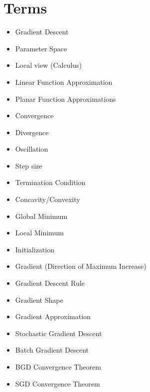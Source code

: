 \section{Terms}
    
    \begin{itemize}
        \item Gradient Descent
        \item Parameter Space
        \item Local view (Calculus)
        \item Linear Function Approximation
        \item Planar Function Approximations
        \item Convergence
        \item Divergence
        \item Oscillation
        \item Step size
        \item Termination Condition
        \item Concavity/Convexity
        \item Global Minimum
        \item Local Minimum
        \item Initialization
        \item Gradient (Direction of Maximum Increase)
        \item Gradient Descent Rule
        \item Gradient Shape
        \item Gradient Approximation
        \item Stochastic Gradient Descent
        \item Batch Gradient Descent
        \item BGD Convergence Theorem
        \item SGD Convergence Theorem
    \end{itemize}